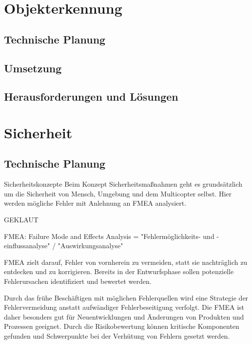 \section{Objekterkennung}

  \subsection{Technische Planung}

  \subsection{Umsetzung}

  \subsection{Herausforderungen und Lösungen}

\section{Sicherheit}

  \subsection{Technische Planung}

Sicherheitskonzepte
Beim Konzept Sicherheitsmaßnahmen geht es grundsätzlich um die Sicherheit von Mensch, Umgebung und dem Multicopter selbst. Hier werden mögliche Fehler mit Anlehnung an FMEA analysiert.

GEKLAUT

FMEA: Failure Mode and Effects Analysis = "Fehlermöglichkeits- und -einflussanalyse" / "Auswirkungsanalyse"

FMEA zielt darauf, Fehler von vornherein zu vermeiden, statt sie nachträglich zu entdecken und zu korrigieren. Bereits in der Entwurfsphase sollen potenzielle Fehlerursachen identifiziert und bewertet werden. 

Durch das frühe Beschäftigen mit möglichen Fehlerquellen wird eine Strategie der Fehlervermeidung anstatt aufwändiger Fehlerbeseitigung verfolgt. Die FMEA ist daher besonders gut für Neuentwicklungen und Änderungen von Produkten und Prozessen geeignet. Durch die Risikobewertung können kritische Komponenten gefunden und Schwerpunkte bei der Verhütung von Fehlern gesetzt werden.

